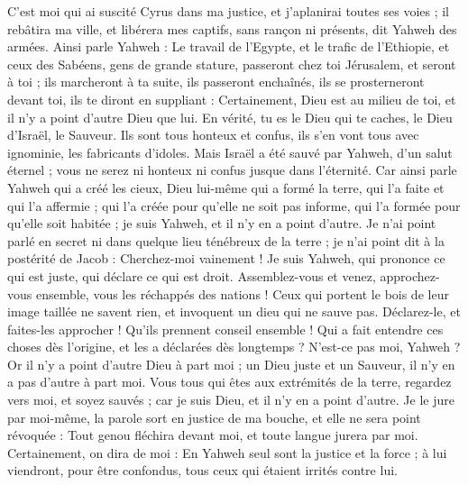 \begin{multicols}{2}
C'est moi qui ai suscité Cyrus dans ma justice, et j'aplanirai toutes ses voies ; il rebâtira ma ville, et libérera mes captifs, sans rançon ni présents, dit Yahweh des armées.
Ainsi parle Yahweh : Le travail de l'Egypte, et le trafic de l'Ethiopie, et ceux des Sabéens, gens de grande stature, passeront chez toi Jérusalem, et seront à toi ; ils marcheront à ta suite, ils passeront enchaînés, ils se prosterneront devant toi, ils te diront en suppliant : Certainement, Dieu est au milieu de toi, et il n'y a point d'autre Dieu que lui.
En vérité, tu es le Dieu qui te caches, le Dieu d'Israël, le Sauveur.
Ils sont tous honteux et confus, ils s'en vont tous avec ignominie, les fabricants d'idoles.
Mais Israël a été sauvé par Yahweh, d'un salut éternel ; vous ne serez ni honteux ni confus jusque dans l'éternité.
Car ainsi parle Yahweh qui a créé les cieux, Dieu lui-même qui a formé la terre, qui l'a faite et qui l'a affermie ; qui l'a créée pour qu'elle ne soit pas informe, qui l'a formée pour qu'elle soit habitée ; je suis Yahweh, et il n'y en a point d'autre.
Je n'ai point parlé en secret ni dans quelque lieu ténébreux de la terre ; je n'ai point dit à la postérité de Jacob : Cherchez-moi vainement ! Je suis Yahweh, qui prononce ce qui est juste, qui déclare ce qui est droit.
Assemblez-vous et venez, approchez-vous ensemble, vous les réchappés des nations ! Ceux qui portent le bois de leur image taillée ne savent rien, et invoquent un dieu qui ne sauve pas.
Déclarez-le, et faites-les approcher ! Qu'ils prennent conseil ensemble ! Qui a fait entendre ces choses dès l'origine, et les a déclarées dès longtemps ? N'est-ce pas moi, Yahweh ? Or il n'y a point d'autre Dieu à part moi ; un Dieu juste et un Sauveur, il n'y en a pas d'autre à part moi.
Vous tous qui êtes aux extrémités de la terre, regardez vers moi, et soyez sauvés ; car je suis Dieu, et il n'y en a point d'autre.
Je le jure par moi-même, la parole sort en justice de ma bouche, et elle ne sera point révoquée : Tout genou fléchira devant moi, et toute langue jurera par moi.
Certainement, on dira de moi : En Yahweh seul sont la justice et la force ; à lui viendront, pour être confondus, tous ceux qui étaient irrités contre lui.

\end{multicols}
